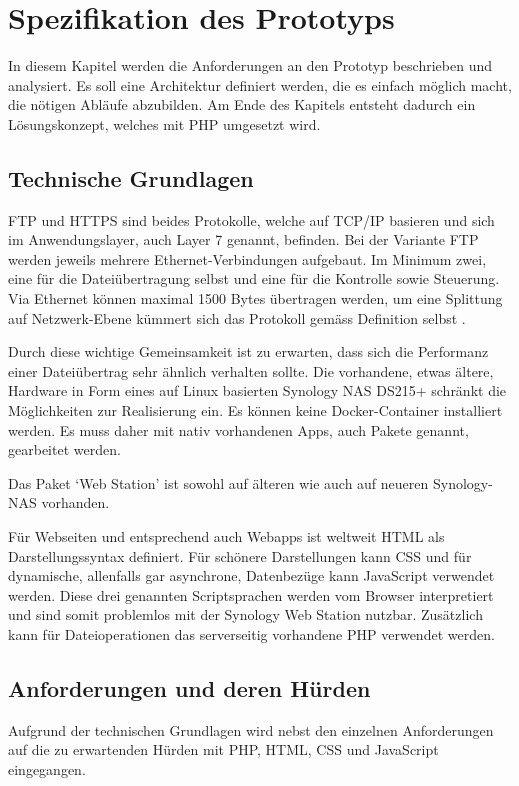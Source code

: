 \chapter{Spezifikation des Prototyps}
In diesem Kapitel werden die Anforderungen an den Prototyp beschrieben und analysiert. 
Es soll eine Architektur definiert werden, die es einfach möglich macht, die nötigen Abläufe abzubilden. 
Am Ende des Kapitels entsteht dadurch ein Lösungskonzept, welches mit PHP umgesetzt wird.

\section{Technische Grundlagen}
FTP und HTTPS sind beides Protokolle, welche auf TCP/IP basieren und sich im Anwendungslayer, auch Layer 7 genannt, befinden. \cite[p.~26]{Zisler}  
Bei der Variante FTP werden jeweils mehrere Ethernet-Verbindungen aufgebaut. Im Minimum zwei, eine für die Dateiübertragung selbst und eine für die Kontrolle sowie Steuerung.
Via Ethernet können maximal 1500 Bytes übertragen werden, um eine Splittung auf Netzwerk-Ebene kümmert sich das Protokoll gemäss Definition selbst \cite[p.~275ff]{Zisler}.

Durch diese wichtige Gemeinsamkeit ist zu erwarten, dass sich die Performanz einer Dateiübertrag sehr ähnlich verhalten sollte.
Die vorhandene, etwas ältere, Hardware in Form eines auf Linux basierten Synology NAS DS215+ schränkt die Möglichkeiten zur Realisierung ein. 
Es können keine Docker-Container installiert werden. Es muss daher mit nativ vorhandenen Apps, auch Pakete genannt, gearbeitet werden.  

Das Paket `Web Station' ist sowohl auf älteren wie auch auf neueren Synology-NAS vorhanden. \cite{SynologyWS} 

Für Webseiten und entsprechend auch Webapps ist weltweit HTML als Darstellungssyntax definiert. 
Für schönere Darstellungen kann CSS und für dynamische, allenfalls gar asynchrone, Datenbezüge kann JavaScript verwendet werden. \cite[p.~174]{Butz} 
Diese drei genannten Scriptsprachen werden vom Browser interpretiert und sind somit problemlos mit der Synology Web Station nutzbar.
Zusätzlich kann für Dateioperationen das serverseitig vorhandene PHP \cite{SynologyWS} verwendet werden.

\section{Anforderungen und deren Hürden}
Aufgrund der technischen Grundlagen wird nebst den einzelnen Anforderungen auf die zu erwartenden Hürden mit PHP, HTML, CSS und JavaScript eingegangen.


